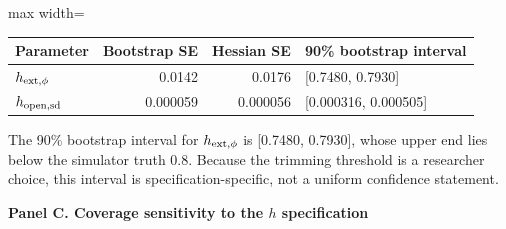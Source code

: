 \begin{table}[!htbp]
\begin{adjustbox}{max width=\linewidth}
\begin{tabular}{@{}lrrl@{}}
\toprule
Parameter & Bootstrap SE & Hessian SE & 90\% bootstrap interval \\
\midrule
$h_{\rm ext,\phi}$ & 0.0142 & 0.0176 & [0.7480, 0.7930] \\
$h_{\rm open,sd}$ & 0.000059 & 0.000056 & [0.000316, 0.000505] \\
\bottomrule
\end{tabular}
\end{adjustbox}
\vspace{0.5em}
\par\noindent\begin{minipage}{\linewidth}\raggedright{\scriptsize The 90\% bootstrap interval for $h_{\rm ext,\phi}$ is [0.7480, 0.7930], whose upper end lies below the simulator truth 0.8. Because the trimming threshold is a researcher choice, this interval is specification-specific, not a uniform confidence statement.}\end{minipage}\par

\vspace{0.4em}
\par\textbf{Panel C. Coverage sensitivity to the $h$ specification}
\vspace{0.1em}


\end{table}
